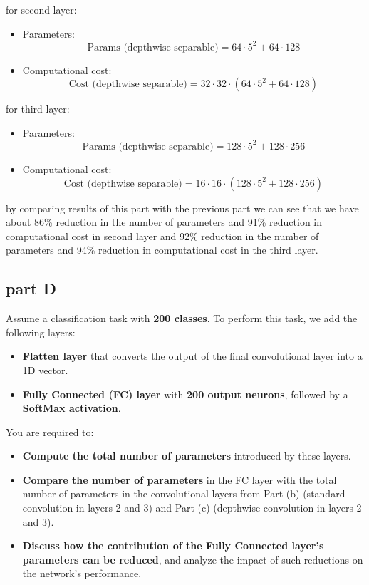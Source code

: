 \begin{qsolve}
\begin{qsolve}[]
        for second layer:
        \begin{itemize}
            \item Parameters:
            \[
            \text{Params (depthwise separable)} = 64 \cdot 5^2 + 64 \cdot 128
            \]
            \item Computational cost:
            \[
            \text{Cost (depthwise separable)} = 32 \cdot 32 \cdot (64 \cdot 5^2 + 64 \cdot 128)
            \]
        \end{itemize}
        for third layer:
        \begin{itemize}
            \item Parameters:
            \[
            \text{Params (depthwise separable)} = 128 \cdot 5^2 + 128 \cdot 256
            \]
            \item Computational cost:
            \[
            \text{Cost (depthwise separable)} = 16 \cdot 16 \cdot (128 \cdot 5^2 + 128 \cdot 256)
            \]
        \end{itemize}
        \splitqsolve[\splitqsolve]
        by comparing results of this part with the previous part we can see that we have about 86\% reduction in the number of parameters and 91\% reduction in computational cost in second layer and 92\% reduction in the number of parameters and 94\% reduction in computational cost in the third layer.
    \end{qsolve}
\end{qsolve}
\subsection{part D}
Assume a classification task with \textbf{200 classes}. To perform this task, we add the following layers:

\begin{itemize}
    \item \textbf{Flatten layer} that converts the output of the final convolutional layer into a 1D vector.
    \item \textbf{Fully Connected (FC) layer} with \textbf{200 output neurons}, followed by a \textbf{SoftMax activation}.
\end{itemize}

You are required to:
\begin{itemize}
    \item \textbf{Compute the total number of parameters} introduced by these layers.
    \item \textbf{Compare the number of parameters} in the FC layer with the total number of parameters in the convolutional layers from Part (b) (standard convolution in layers 2 and 3) and Part (c) (depthwise convolution in layers 2 and 3).
    \item \textbf{Discuss how the contribution of the Fully Connected layer's parameters can be reduced}, and analyze the impact of such reductions on the network's performance.
\end{itemize}

